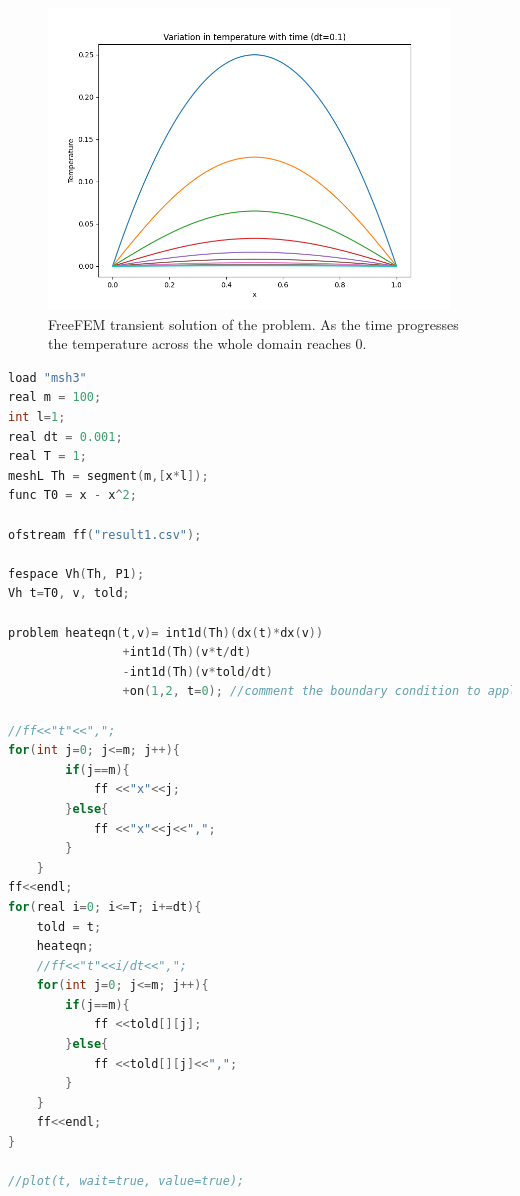 \documentclass[11pt]{article} %
\begin{document}
\begin{figure}[H]
\centering
\includegraphics[width=0.95\textwidth]{figures/p111.png}
\caption{FreeFEM transient solution of the problem. As the time progresses the temperature across the whole domain reaches 0.}
\end{figure}
\newpage
\begin{lstlisting}[language=C++, caption=Problem 1 Code ]
load "msh3"
real m = 100;
int l=1;
real dt = 0.001;
real T = 1;
meshL Th = segment(m,[x*l]);
func T0 = x - x^2; 

ofstream ff("result1.csv");

fespace Vh(Th, P1);
Vh t=T0, v, told;

problem heateqn(t,v)= int1d(Th)(dx(t)*dx(v))
				+int1d(Th)(v*t/dt)
				-int1d(Th)(v*told/dt)
				+on(1,2, t=0); //comment the boundary condition to apply the neumann b.c. erquired in the section 1.2

//ff<<"t"<<",";
for(int j=0; j<=m; j++){
		if(j==m){
			ff <<"x"<<j;
		}else{
			ff <<"x"<<j<<",";
		}
	}
ff<<endl;
for(real i=0; i<=T; i+=dt){
	told = t;
	heateqn;
	//ff<<"t"<<i/dt<<",";
	for(int j=0; j<=m; j++){
		if(j==m){
			ff <<told[][j];
		}else{
			ff <<told[][j]<<",";
		}
	}
	ff<<endl;
}

//plot(t, wait=true, value=true);
\end{lstlisting}
\vspace{0.5cm}
\end{document}
